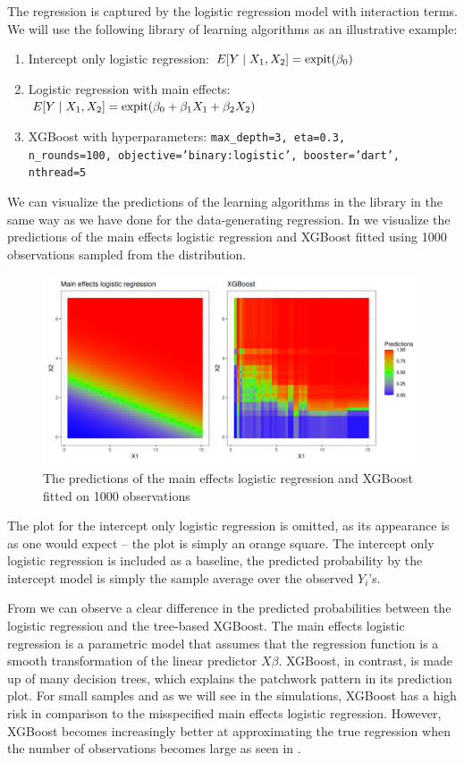 \documentclass[./main.tex]{subfiles}
\begin{document}
The regression is captured by the logistic regression model with interaction terms. We will use the following library of learning algorithms as an illustrative example:
\begin{enumerate}
    \item Intercept only logistic regression: $E[Y \mid X_1, X_2] = \operatorname{expit}(\beta_0)$
    \item Logistic regression with main effects: $E[Y \mid X_1, X_2] = \operatorname{expit}(\beta_0 + \beta_1 X_1 + \beta_2 X_2)$
    \item XGBoost with hyperparameters: \texttt{max\_depth=3, eta=0.3,\\ n\_rounds=100, objective='binary:logistic', booster='dart', nthread=5}
\end{enumerate}
We can visualize the predictions of the learning algorithms in the library in the same way as we have done for the data-generating regression. In  we visualize the predictions of the main effects logistic regression and XGBoost fitted using 1000 observations sampled from the distribution. 
\begin{figure}
    \centering
    \includegraphics[width=\textwidth]{figures/predictpar.png}
    \caption{The predictions of the main effects logistic regression and XGBoost fitted on 1000 observations}
    \label{fig:predictpar}
\end{figure}

The plot for the intercept only logistic regression is omitted, as its appearance is as one would expect -- the plot is simply an orange square. The intercept only logistic regression is included as a baseline, the predicted probability by the intercept model is simply the sample average over the observed $ Y_i$'s. 

From  we can observe a clear difference in the predicted probabilities between the logistic regression and the tree-based XGBoost. The main effects logistic regression is a parametric model that assumes that the regression function is a smooth transformation of the linear predictor $ X\beta $. XGBoost, in contrast, is made up of many decision trees, which explains the patchwork pattern in its prediction plot. For small samples and as we will see in the simulations, XGBoost has a high risk in comparison to the misspecified main effects logistic regression. However, XGBoost becomes increasingly better at approximating the true regression when the number of observations becomes large as seen in . 
\end{document}
